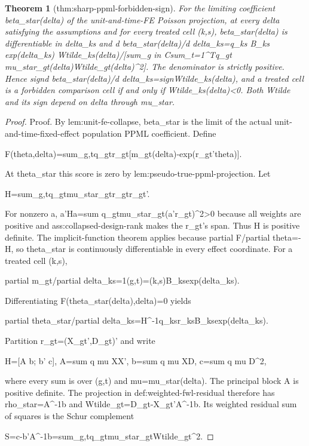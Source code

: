 \documentclass{article}
\newtheorem{theorem}{Theorem}
\begin{document}
\begin{theorem}[thm:sharp-ppml-forbidden-sign]\label{thm:sharp-ppml-forbidden-sign}
For the limiting coefficient beta_star(delta) of the unit-and-time-FE Poisson projection, at every delta satisfying the assumptions and for every treated cell (k,s), beta_star(delta) is differentiable in delta_ks and d beta_star(delta)/d delta_ks=q_ks B_ks exp(delta_ks) Wtilde_ks(delta)/[sum_{g in C}sum_{t=1}^Tq_gt mu_star_gt(delta)Wtilde_gt(delta)^2]. The denominator is strictly positive. Hence sign{d beta_star(delta)/d delta_ks}=sign{Wtilde_ks(delta)}, and a treated cell is a forbidden comparison cell if and only if Wtilde_ks(delta)<0. Both Wtilde and its sign depend on delta through mu_star.
\end{theorem}
\begin{proof}
Proof. By lem:unit-fe-collapse, beta_star is the limit of the actual unit-and-time-fixed-effect population PPML coefficient. Define

  F(theta,delta)=sum_{g,t}q_{gt}r_{gt}[m_{gt}(delta)-exp(r_{gt}'theta)].

At theta_star this score is zero by lem:pseudo-true-ppml-projection. Let

  H=sum_{g,t}q_{gt}mu_star_{gt}r_{gt}r_{gt}'.

For nonzero a, a'Ha=sum q_{gt}mu_star_{gt}(a'r_{gt})^2>0 because all weights are positive and ass:collapsed-design-rank makes the r_{gt}'s span. Thus H is positive definite. The implicit-function theorem applies because partial F/partial theta=-H, so theta_star is continuously differentiable in every effect coordinate. For a treated cell (k,s),

  partial m_{gt}/partial delta_{ks}=1{(g,t)=(k,s)}B_{ks}exp(delta_{ks}).

Differentiating F(theta_star(delta),delta)=0 yields

  partial theta_star/partial delta_{ks}=H^{-1}q_{ks}r_{ks}B_{ks}exp(delta_{ks}).

Partition r_{gt}=(X_{gt}',D_{gt})' and write

  H=[A b; b' c],
  A=sum q mu XX',  b=sum q mu XD,  c=sum q mu D^2,

where every sum is over (g,t) and mu=mu_star(delta). The principal block A is positive definite. The projection in def:weighted-fwl-residual therefore has rho_star=A^{-1}b and Wtilde_{gt}=D_{gt}-X_{gt}'A^{-1}b. Its weighted residual sum of squares is the Schur complement

  S=c-b'A^{-1}b=sum_{g,t}q_{gt}mu_star_{gt}Wtilde_{gt}^2.


\end{proof}
\end{document}
